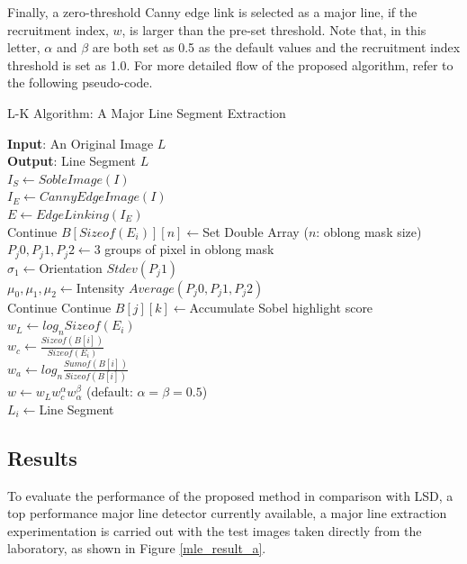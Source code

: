 \documentclass{ieeeaccess}
\begin{document}
Finally, a zero-threshold Canny edge link is selected as a
major line, if the recruitment index, $w$, is larger than the pre-set
threshold. Note that, in this letter, $\alpha$ and $\beta$ are both set as 0.5 as
the default values and the recruitment index threshold is set as
1.0. For more detailed flow of the proposed algorithm, refer to
the following pseudo-code.
\begin{algorithm}
\caption{L-K Algorithm: A Major Line Segment Extraction}
\SetAlgoLined
\textbf{Input}: An Original Image $L$\\
\textbf{Output}: Line Segment $L$ \\
$I_{S}\leftarrow SobleImage(I)$ \\
$I_{E}\leftarrow CannyEdgeImage(I)$ \\
$E\leftarrow EdgeLinking(I_E)$ \\
 {
	 {
		Continue	
	}
	$B[Sizeof(E_i)][n]\leftarrow$Set Double Array ($n$: oblong mask size) \\
	 {
		$P_j0, P_j1, P_j2\leftarrow$3 groups of pixel in oblong mask \\
		$\sigma_1\leftarrow$Orientation $Stdev(P_j1)$ \\ 
		$\mu_0, \mu_1, \mu_2\leftarrow$Intensity $Average(P_j0, P_j1, P_j2)$ \\
		 {
			Continue		
		}
		 {
			Continue		
		}
		 {
			$B[j][k]\leftarrow$Accumulate Sobel highlight score		
		}
	}
	$w_L\leftarrow log_n Sizeof(E_i)$ \\
	$w_c\leftarrow \frac{Sizeof(B[i])}{Sizeof(E_i)}$ \\
	$w_a\leftarrow log_n\frac{Sumof(B[i])}{Sizeof(B[i])}$ \\
	$w\leftarrow w_Lw_{c}^{\alpha}w_{\alpha}^{\beta}$ (default: $\alpha=\beta=0.5$) \\
	 {
		$L_i\leftarrow$Line Segment	
	}
}
\end{algorithm}

\subsection{Results}
To evaluate the performance of the proposed method in comparison with LSD, a top performance major line detector currently available, a major line extraction experimentation is carried out with the test images taken directly from the laboratory,
as shown in Figure \ref{mle_result_a}.
\end{document}
